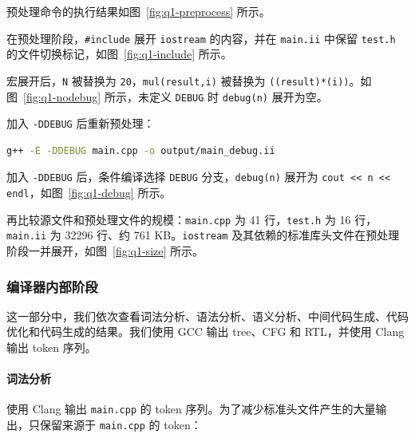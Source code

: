 预处理命令的执行结果如图~\ref{fig:q1-preprocess} 所示。


在预处理阶段，\texttt{\#include} 展开 \texttt{iostream} 的内容，并在 \texttt{main.ii} 中保留 \texttt{test.h} 的文件切换标记，如图~\ref{fig:q1-include} 所示。


宏展开后，\texttt{N} 被替换为 \texttt{20}，\texttt{mul(result,i)} 被替换为 \texttt{((result)*(i))}。如图~\ref{fig:q1-nodebug} 所示，未定义 \texttt{DEBUG} 时 \texttt{debug(n)} 展开为空。


加入 \texttt{-DDEBUG} 后重新预处理：

\begin{lstlisting}[language=bash]
g++ -E -DDEBUG main.cpp -o output/main_debug.ii
\end{lstlisting}

加入 \texttt{-DDEBUG} 后，条件编译选择 \texttt{DEBUG} 分支，\texttt{debug(n)} 展开为 \texttt{cout << n << endl}，如图~\ref{fig:q1-debug} 所示。


再比较源文件和预处理文件的规模：\texttt{main.cpp} 为 41 行，\texttt{test.h} 为 16 行，\texttt{main.ii} 为 32296 行、约 761 KB。\texttt{iostream} 及其依赖的标准库头文件在预处理阶段一并展开，如图~\ref{fig:q1-size} 所示。



\subsubsection{编译器内部阶段}

这一部分中，我们依次查看词法分析、语法分析、语义分析、中间代码生成、代码优化和代码生成的结果。我们使用 GCC 输出 tree、CFG 和 RTL，并使用 Clang 输出 token 序列。

\paragraph{词法分析}

使用 Clang 输出 \texttt{main.cpp} 的 token 序列。为了减少标准头文件产生的大量输出，只保留来源于 \texttt{main.cpp} 的 token：

